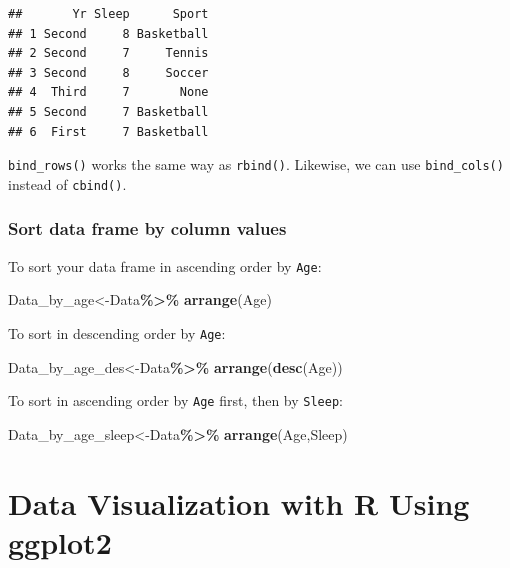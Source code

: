 \documentclass[
]{book}
\newenvironment{Shaded}{\begin{snugshade}}{\end{snugshade}}
\newcommand{\FunctionTok}[1]{\textcolor[rgb]{0.13,0.29,0.53}{\textbf{#1}}}
\newcommand{\NormalTok}[1]{#1}
\newcommand{\OtherTok}[1]{\textcolor[rgb]{0.56,0.35,0.01}{#1}}
\newcommand{\SpecialCharTok}[1]{\textcolor[rgb]{0.81,0.36,0.00}{\textbf{#1}}}
\begin{document}
\begin{verbatim}
##       Yr Sleep      Sport
## 1 Second     8 Basketball
## 2 Second     7     Tennis
## 3 Second     8     Soccer
## 4  Third     7       None
## 5 Second     7 Basketball
## 6  First     7 Basketball
\end{verbatim}

\texttt{bind\_rows()} works the same way as \texttt{rbind()}. Likewise, we can use \texttt{bind\_cols()} instead of \texttt{cbind()}.

\hypertarget{sort-data-frame-by-column-values-1}{%
\subsection{Sort data frame by column values}\label{sort-data-frame-by-column-values-1}}

To sort your data frame in ascending order by \texttt{Age}:

\begin{Shaded}
\begin{Highlighting}[]
\NormalTok{Data\_by\_age}\OtherTok{\textless{}{-}}\NormalTok{Data}\SpecialCharTok{\%\textgreater{}\%}
  \FunctionTok{arrange}\NormalTok{(Age)}
\end{Highlighting}
\end{Shaded}

To sort in descending order by \texttt{Age}:

\begin{Shaded}
\begin{Highlighting}[]
\NormalTok{Data\_by\_age\_des}\OtherTok{\textless{}{-}}\NormalTok{Data}\SpecialCharTok{\%\textgreater{}\%}
  \FunctionTok{arrange}\NormalTok{(}\FunctionTok{desc}\NormalTok{(Age))}
\end{Highlighting}
\end{Shaded}

To sort in ascending order by \texttt{Age} first, then by \texttt{Sleep}:

\begin{Shaded}
\begin{Highlighting}[]
\NormalTok{Data\_by\_age\_sleep}\OtherTok{\textless{}{-}}\NormalTok{Data}\SpecialCharTok{\%\textgreater{}\%}
  \FunctionTok{arrange}\NormalTok{(Age,Sleep)}
\end{Highlighting}
\end{Shaded}

\hypertarget{viz}{%
\chapter{Data Visualization with R Using ggplot2}\label{viz}}
\end{document}
